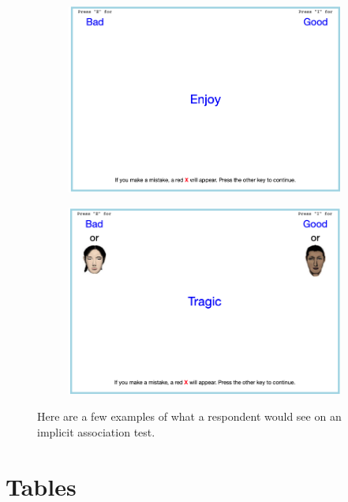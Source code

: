 \documentclass[12pt, fullpage]{article}
\newcommand{\note}[1]{\flushleft\footnotesize{#1}}
\begin{document}
\begin{figure}[H]
\begin{subfigure}{.48\textwidth}
\end{subfigure}
\begin{subfigure}{.48\textwidth}
\centering
\includegraphics[width=.9\linewidth]{figure/iatexample4.png}
\end{subfigure}
\begin{subfigure}{.48\textwidth}
\centering
\includegraphics[width=.9\linewidth]{figure/iatexample5.png}
\end{subfigure}
\flushleft\footnotesize{\note{Here are a few examples of what a respondent would see on an implicit association test.}}
\end{figure}


\section{Tables}



\newpage
\end{document}
